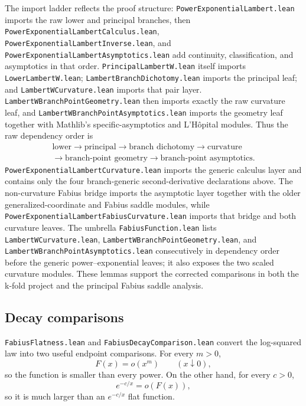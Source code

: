 \documentclass[11pt,oneside]{article}
\theoremstyle{definition}
\theoremstyle{remark}
\begin{document}
The import ladder reflects the proof structure:
\nolinkurl{PowerExponentialLambert.lean} imports the raw lower and principal
branches, then
\nolinkurl{PowerExponentialLambertCalculus.lean},
\nolinkurl{PowerExponentialLambertInverse.lean}, and
\nolinkurl{PowerExponentialLambertAsymptotics.lean} add continuity,
classification, and asymptotics in that order.
\nolinkurl{PrincipalLambertW.lean} itself imports
\nolinkurl{LowerLambertW.lean};
\nolinkurl{LambertBranchDichotomy.lean} imports the principal leaf; and
\nolinkurl{LambertWCurvature.lean} imports that pair layer.
\nolinkurl{LambertWBranchPointGeometry.lean} then imports exactly the raw
curvature leaf, and
\nolinkurl{LambertWBranchPointAsymptotics.lean} imports the geometry leaf
together with Mathlib's specific-asymptotics and L'H\^opital modules.  Thus
the raw dependency order is
\[
 \begin{gathered}
 \text{lower}\longrightarrow\text{principal}\longrightarrow
 \text{branch dichotomy}\longrightarrow\text{curvature}\\
 {}\longrightarrow\text{branch-point geometry}\longrightarrow
 \text{branch-point asymptotics}.
 \end{gathered}
\]
\nolinkurl{PowerExponentialLambertCurvature.lean} imports the generic
calculus layer and contains only the four branch-generic second-derivative
declarations above.  The non-curvature Fabius bridge imports the asymptotic
layer together with the older generalized-coordinate and Fabius saddle
modules, while
\nolinkurl{PowerExponentialLambertFabiusCurvature.lean} imports that bridge
and both curvature leaves.  The umbrella \nolinkurl{FabiusFunction.lean}
lists \nolinkurl{LambertWCurvature.lean},
\nolinkurl{LambertWBranchPointGeometry.lean}, and
\nolinkurl{LambertWBranchPointAsymptotics.lean} consecutively in dependency
order before the generic power--exponential leaves; it also exposes the two
scaled curvature modules.  These lemmas support the corrected
comparisons in both the k-fold project and the principal Fabius saddle
analysis.

\subsection{Decay comparisons}
\nolinkurl{FabiusFlatness.lean} and \nolinkurl{FabiusDecayComparison.lean} convert the log-squared law into two useful endpoint comparisons.  For every \(m>0\),
\[
  F(x)=o(x^m)
  \qquad(x\downarrow0),
\]
so the function is smaller than every power.  On the other hand, for every \(c>0\),
\[
  e^{-c/x}=o(F(x)),
\]
so it is much larger than an \(e^{-c/x}\) flat function.
\end{document}
